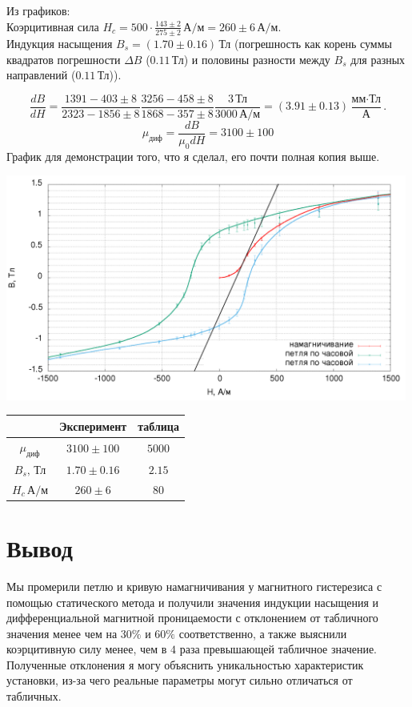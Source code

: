 \documentclass[a4paper]{article}
\begin{document}
\begin{enumerate}
Из графиков:\\
Коэрцитивная сила $H_{c}=500\cdot\frac{143\pm2}{275\pm2}\,\text{А}/\text{м} = 260\pm6\,\text{А}/\text{м}.$ \\
Индукция насыщения $B_s = (1.70\pm0.16)\,\text{Тл}$ (погрешность как корень суммы квадратов погрешности $\Delta B$ ($0.11\,\text{Тл}$) и половины разности между $B_s$ для разных направлений ($0.11\,\text{Тл}$)).

$$\frac{dB}{dH} = \frac{1391-403\pm8}{2323-1856\pm8}\frac{3256-458\pm8}{1868-357\pm8}\frac{3\,\text{Тл}}{3000\,\text{А}/\text{м}} = (3.91\pm0.13) \frac{\text{мм} \cdot\text{Тл}}{\text{А}}.$$
$$\mu_\text{диф} = \frac{dB}{\mu_0dH} = 3100\pm100$$
График для демонстрации того, что я сделал, его почти полная копия выше.
\begin{center}
\includegraphics[width=0.99\textwidth]{6_res.png}
\end{center}

\end{enumerate}

\begin{center}
\begin{tabular}{|c|c|c|}
\hline
&Эксперимент&таблица\\\hline
$\mu_\text{диф}$&$3100\pm100$&$5000$\\\hline
$B_s,\,\text{Тл}$&$1.70\pm0.16$&$2.15$\\\hline
$H_{c}\,\text{А}/\text{м}$&$260\pm6$&$80$\\\hline
\end{tabular}
\end{center}
\section{Вывод}
Мы промерили петлю и кривую намагничивания у магнитного гистерезиса с помощью статического метода и получили значения индукции насыщения и дифференциальной магнитной проницаемости с отклонением от табличного значения менее чем на $30\%$ и $60\%$ соответственно, а также выяснили коэрцитивную силу менее, чем в $4$ раза превышающей табличное значение. Полученные отклонения я могу объяснить уникальностью характеристик установки, из-за чего реальные параметры могут сильно отличаться от табличных.
\end{document}
